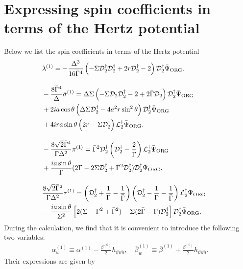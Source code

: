 \documentclass[aps,prd,amsmath,floats,floatfix, twocolumn,
superscriptaddress,nofootinbib,showpacs]{revtex4-1}
\newcommand{\hertzbar}{\bar{\Psi}_{\rm ORG}}
\begin{document}
\section{Expressing spin coefficients in terms of the Hertz potential}
\label{app:spin_coefficients}
Below we list the spin coefficients in terms of the Hertz potential
\begin{alignat}{2}
    &\lambda^{(1)}= -\frac{\Delta^3}{16\bar{\Gamma}^4}\left(-\Sigma\mathcal{D}_2^\dagger\mathcal{D}_2^\dagger +2r\mathcal{D}_2^\dagger-2\right) \mathcal{D}_2^\dagger\hertzbar. \label{eq:lambda_1st_order} &\\[10pt]
    &-\frac{8\bar{\Gamma}^4}{\Delta}\bar{\sigma}^{(1)}= \Delta \Sigma  \left(-\Sigma \mathcal{D}_2\mathcal{D}^\dagger_2  - 2 + 2  \bar{\Gamma} \mathcal{D}_2 \right) \mathcal{D}^\dagger_2\hertzbar& \notag \\
    & +2i a \cos\theta\left( \Delta \Sigma \mathcal{D}^\dagger_2 - 4 a^2 r \sin^2\theta \right) \mathcal{D}^\dagger_2\hertzbar &  \notag \\
    & + 4ira \sin\theta\left(2 r -  \Sigma \mathcal{D}^\dagger_2 \right) \mathcal{L}^\dagger_2  \hertzbar.&  \\[10pt]
    &-\frac{8\sqrt{2}\bar{\Gamma}^4}{\Gamma\Delta^2}\pi^{(1)}=\bar{\Gamma}^2 \mathcal{D}_2^\dagger\left(\mathcal{D}_2^\dagger-\frac{2}{\bar{\Gamma}}\right)\mathcal{L}^\dagger_2\hertzbar &\notag \\
    & +\frac{ia\sin\theta}{\Gamma} (2\Gamma - 2\Sigma \mathcal{D}^\dagger_2 +  \bar{\Gamma}^2 \mathcal{D}^\dagger_2)\mathcal{D}^\dagger_2\hertzbar.&\\[10pt]
    &\frac{8\sqrt{2}\bar{\Gamma}^2}{\Gamma\Delta^2}\bar{\tau}^{(1)}=\left(\mathcal{D}_2^\dagger+\frac{1}{\Gamma}-\frac{1}{\bar{\Gamma}}\right) \left(\mathcal{D}_2^\dagger-\frac{1}{\Gamma}-\frac{1}{\bar{\Gamma}}\right) \mathcal{L}^\dagger_2\hertzbar &\notag \\
    & -\frac{ia\sin\theta}{\Sigma^2} \left[2 ( \Sigma-\Gamma^2 + \bar{\Gamma}^2)-\Sigma  (2\bar{\Gamma}-\Gamma) \mathcal{D}^\dagger_2\right]\mathcal{D}^\dagger_2\hertzbar.&
\end{alignat}   
During the calculation, we find that it is convenient to introduce the following two variables:
\begin{align}
    &\alpha_w^{(1)}
    \equiv\alpha^{(1)}-\frac{\beta^{(0)}}{2}h_{\bar{m}\bar{m}}, \quad \bar{\beta}_w^{(1)}\equiv\bar{\beta}^{(1)}+\frac{\beta^{(0)}}{2}h_{\bar{m}\bar{m}}. \label{eq:alphaw_betaw} 
\end{align}
Their expressions are given by 
\end{document}

